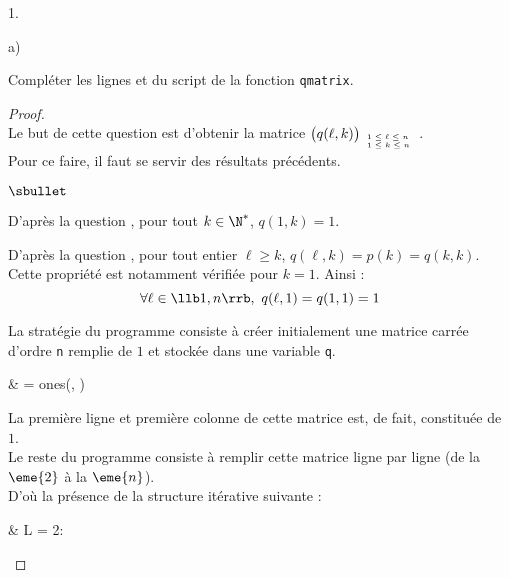 \documentclass[11pt]{article}%
\begin{document}
\begin{noliste}{1.}
  \newpage


  \begin{noliste}{a)}
    \setlength{\itemsep}{2mm}
  \item Compléter les lignes  et  du script de la
    fonction {\tt qmatrix}.

    \begin{proof}~\\%
      Le but de cette question est d'obtenir la matrice $\big(q(\ell,
      k) \big)_{\tiny
        \begin{array}{l}
          1 \leq \ell \leq n \\
          1 \leq k \leq n 
        \end{array}
      }$.\\
      Pour ce faire, il faut se servir des résultats précédents.
      \begin{noliste}{$\sbullet$}
      \item D'après la question , pour tout $k \in
        \N^*$, $q(1, k) = 1$.%

      \item D'après la question , pour tout entier
        $\ell \geq k$, $q(\ell, k) = p(k) = q(k, k)$. Cette propriété
        est notamment vérifiée pour $k = 1$. Ainsi :
        \[
        \forall \ell \in \llb 1, n \rrb, \ q(\ell, 1) = q(1, 1) = 1
        \]

      \item La stratégie du programme consiste à créer initialement
        une matrice carrée d'ordre {\tt n} remplie de $1$ et stockée
        dans une variable {\tt q}.
        \begin{scilabC}{1}
          & \qquad {} = ones(, ) \nl %
        \end{scilabC}
        La première ligne et première colonne de cette matrice est, de
        fait, constituée de $1$.\\
        Le reste du programme consiste à remplir cette matrice ligne
        par ligne (de la $\eme{2}$ à la $\eme{n}$).\\
        D'où la présence de la structure itérative suivante :
        \begin{scilabC}{2}
          & \qquad {} L = 2: \nl %
        \end{scilabC} 
        

\end{noliste}
\end{proof}
\end{noliste}
\end{noliste}
\end{document}
